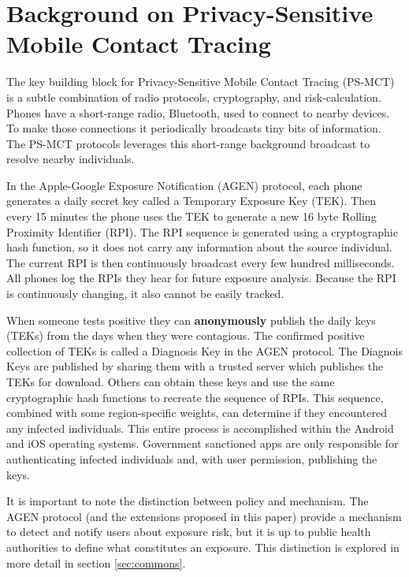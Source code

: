 
\section{Background on Privacy-Sensitive Mobile Contact Tracing}

The key building block for Privacy-Sensitive Mobile Contact Tracing (PS-MCT) is a subtle combination of radio protocols, cryptography, and risk-calculation.  
Phones have a short-range radio, Bluetooth, used to connect to nearby devices.  
To make those connections it periodically broadcasts tiny bits of information. 
The PS-MCT protocols leverages this short-range background broadcast to resolve nearby individuals.


In the Apple-Google Exposure Notification (AGEN) protocol, each phone generates a daily secret key called a Temporary Exposure Key (TEK).
Then every 15 minutes the phone uses the TEK to generate a new 16 byte Rolling Proximity Identifier (RPI). The RPI sequence is generated using a cryptographic hash function, so it does not carry any information about the source individual.  
The current RPI is then continuously broadcast every few hundred milliseconds.
All phones log the RPIs they hear for future exposure analysis.  
Because the RPI is continuously changing, it also cannot be easily tracked.


When someone tests positive they can \textbf{anonymously} publish the daily keys (TEKs) from the days when they were contagious.  
The confirmed positive collection of TEKs is called a Diagnosis Key in the AGEN protocol.  
The Diagnois Keys are published by sharing them with a trusted server which publishes the TEKs for download.
Others can obtain these keys and use the same cryptographic hash functions to recreate the sequence of RPIs. This sequence, combined with some region-specific weights, can determine if they encountered any infected individuals.  
This entire process is accomplished within the Android and iOS operating systems. Government sanctioned apps are only responsible for authenticating infected individuals and, with user permission, publishing the keys. 

It is important to note the distinction between policy and mechanism. The AGEN protocol (and the extensions proposed in this paper) provide a mechanism to detect and notify users about exposure risk, but it is up to public health authorities to define what constitutes an exposure. This distinction is explored in more detail in section \ref{sec:commons}.


